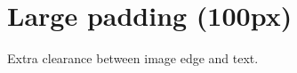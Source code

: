 \documentclass{article}
\begin{document}
\section*{Large padding (100px)}

Extra clearance between image edge and text.

\lipsum[1-5]
\end{document}
